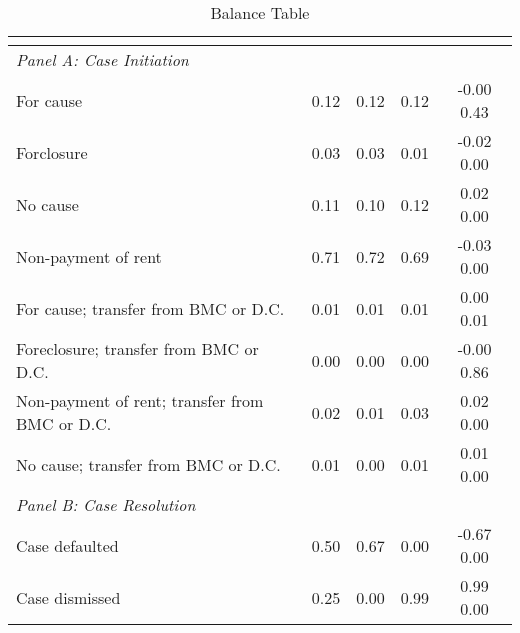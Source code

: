 \begin{table}[htbp]\centering
\def\sym#1{\ifmmode^{#1}\else\(^{#1}\)\fi}
\caption{Balance Table}
\begin{tabular}{l*{4}{c}}
\toprule
                    &&&&\\
\midrule
\emph{Panel A: Case Initiation}&            &            &            &            \\
\hspace{0.25cm}For cause&      0.12  &      0.12  &      0.12  &  -0.00 0.43\\
\hspace{0.25cm}Forclosure&      0.03  &      0.03  &      0.01  &  -0.02 0.00\\
\hspace{0.25cm}No cause&      0.11  &      0.10  &      0.12  &   0.02 0.00\\
\hspace{0.25cm}Non-payment of rent&      0.71  &      0.72  &      0.69  &  -0.03 0.00\\
\hspace{0.25cm}For cause; transfer from BMC or D.C.&      0.01  &      0.01  &      0.01  &   0.00 0.01\\
\hspace{0.25cm}Foreclosure; transfer from BMC or D.C.&      0.00  &      0.00  &      0.00  &  -0.00 0.86\\
\hspace{0.25cm}Non-payment of rent; transfer from BMC or D.C.&      0.02  &      0.01  &      0.03  &   0.02 0.00\\
\hspace{0.25cm}No cause; transfer from BMC or D.C.&      0.01  &      0.00  &      0.01  &   0.01 0.00\\
\emph{Panel B: Case Resolution}&            &            &            &            \\
\hspace{0.25cm}Case defaulted&      0.50  &      0.67  &      0.00  &  -0.67 0.00\\
\hspace{0.25cm}Case dismissed&      0.25  &      0.00  &      0.99  &   0.99 0.00\\

\end{tabular}
\end{table}
